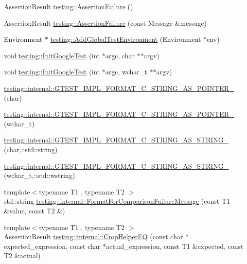 \begin{DoxyCompactItemize}
\item 
Assertion\-Result \hyperlink{namespacetesting_a75cb789614cb1c28c34627a4a3c053df}{testing\-::\-Assertion\-Failure} ()
\item 
Assertion\-Result \hyperlink{namespacetesting_a56f59110a218942d2fc4695914b1685c}{testing\-::\-Assertion\-Failure} (const Message \&message)
\item 
Environment $\ast$ \hyperlink{namespacetesting_a224caeebdb6586b728d204367fea1087}{testing\-::\-Add\-Global\-Test\-Environment} (Environment $\ast$env)
\item 
void \hyperlink{namespacetesting_afd726ae08c9bd16dc52f78c822d9946b}{testing\-::\-Init\-Google\-Test} (int $\ast$argc, char $\ast$$\ast$argv)
\item 
void \hyperlink{namespacetesting_ae5a88709a4a7529e30c83242156556b3}{testing\-::\-Init\-Google\-Test} (int $\ast$argc, wchar\-\_\-t $\ast$$\ast$argv)
\item 
\hyperlink{namespacetesting_1_1internal_a3682f962ae0ec1c0eca6444ca0a09e91}{testing\-::internal\-::\-G\-T\-E\-S\-T\-\_\-\-I\-M\-P\-L\-\_\-\-F\-O\-R\-M\-A\-T\-\_\-\-C\-\_\-\-S\-T\-R\-I\-N\-G\-\_\-\-A\-S\-\_\-\-P\-O\-I\-N\-T\-E\-R\-\_\-} (char)
\item 
\hyperlink{namespacetesting_1_1internal_a85e08f00d443221e529a0a85a90fbaeb}{testing\-::internal\-::\-G\-T\-E\-S\-T\-\_\-\-I\-M\-P\-L\-\_\-\-F\-O\-R\-M\-A\-T\-\_\-\-C\-\_\-\-S\-T\-R\-I\-N\-G\-\_\-\-A\-S\-\_\-\-P\-O\-I\-N\-T\-E\-R\-\_\-} (wchar\-\_\-t)
\item 
\hyperlink{namespacetesting_1_1internal_a9dceb71a64d780beb2db1ed5bf24ad3f}{testing\-::internal\-::\-G\-T\-E\-S\-T\-\_\-\-I\-M\-P\-L\-\_\-\-F\-O\-R\-M\-A\-T\-\_\-\-C\-\_\-\-S\-T\-R\-I\-N\-G\-\_\-\-A\-S\-\_\-\-S\-T\-R\-I\-N\-G\-\_\-} (char,\-::std\-::string)
\item 
\hyperlink{namespacetesting_1_1internal_afaec8a5f66e926e86cd5abed5254ff36}{testing\-::internal\-::\-G\-T\-E\-S\-T\-\_\-\-I\-M\-P\-L\-\_\-\-F\-O\-R\-M\-A\-T\-\_\-\-C\-\_\-\-S\-T\-R\-I\-N\-G\-\_\-\-A\-S\-\_\-\-S\-T\-R\-I\-N\-G\-\_\-} (wchar\-\_\-t,\-::std\-::wstring)
\item 
{\footnotesize template$<$typename T1 , typename T2 $>$ }\\std\-::string \hyperlink{namespacetesting_1_1internal_a91ab078f10adc669f09b7f604975c518}{testing\-::internal\-::\-Format\-For\-Comparison\-Failure\-Message} (const T1 \&value, const T2 \&)
\item 
{\footnotesize template$<$typename T1 , typename T2 $>$ }\\Assertion\-Result \hyperlink{namespacetesting_1_1internal_a36f7c44fad92225cbb45fde1642cf30e}{testing\-::internal\-::\-Cmp\-Helper\-E\-Q} (const char $\ast$expected\-\_\-expression, const char $\ast$actual\-\_\-expression, const T1 \&expected, const T2 \&actual)

\end{DoxyCompactItemize}
